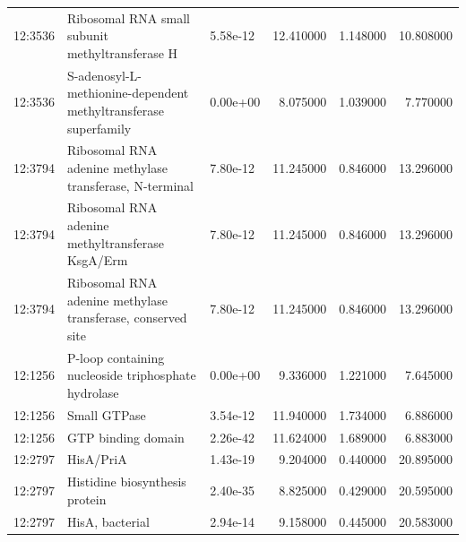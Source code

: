 \begin{tabular}{|l|l|l|r|r|r|}
12:3536 & Ribosomal RNA small subunit methyltransferase H & 5.58e-12 & 12.410000 & 1.148000 & 10.808000 \\
12:3536 & S-adenosyl-L-methionine-dependent methyltransferase superfamily & 0.00e+00 & 8.075000 & 1.039000 & 7.770000 \\
12:3794 & Ribosomal RNA adenine methylase transferase, N-terminal & 7.80e-12 & 11.245000 & 0.846000 & 13.296000 \\
12:3794 & Ribosomal RNA adenine methyltransferase KsgA/Erm & 7.80e-12 & 11.245000 & 0.846000 & 13.296000 \\
12:3794 & Ribosomal RNA adenine methylase transferase, conserved site & 7.80e-12 & 11.245000 & 0.846000 & 13.296000 \\
12:1256 & P-loop containing nucleoside triphosphate hydrolase & 0.00e+00 & 9.336000 & 1.221000 & 7.645000 \\
12:1256 & Small GTPase & 3.54e-12 & 11.940000 & 1.734000 & 6.886000 \\
12:1256 & GTP binding domain & 2.26e-42 & 11.624000 & 1.689000 & 6.883000 \\
12:2797 & HisA/PriA & 1.43e-19 & 9.204000 & 0.440000 & 20.895000 \\
12:2797 & Histidine biosynthesis protein & 2.40e-35 & 8.825000 & 0.429000 & 20.595000 \\
12:2797 & HisA, bacterial & 2.94e-14 & 9.158000 & 0.445000 & 20.583000 \\
\hline
\end{tabular}
